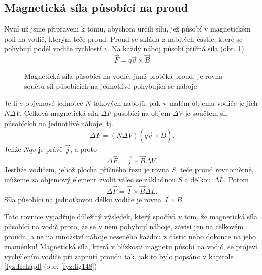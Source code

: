     \subsection{Magnetická síla působící na proud}
      \cite[s.~227]{Feynman02} Nyní už jsme připraveni k tomu, abychom určili sílu, jež působí v 
      magnetickém poli na vodič, kterým teče proud. Proud se skládá z nabitých částic, které se 
      pohybují podél vodiče rychlostí \(v\). Na každý náboj působí příčná síla (obr. 
      \ref{fyz:fig219}).
      \begin{equation}\label{fyz:eq_mag007}
        \vec{F} = q\vec{v}\times\vec{B}
      \end{equation}
      \begin{figure}[ht!]
        \centering
        \caption{Magnetická síla působící na vodič, jímž protéká proud, je rovna součtu sil 
                 působících na jednotlivé pohybující se náboje}
        \label{fyz:fig219} 
      \end{figure}
      Je-li v objemové jednotce \(N\) takových nábojů, pak v malém objemu vodiče je jich \(N\Delta 
      V\). Celková magnetická síla \(\Delta F\) působící na objem \(\Delta V\) je součtem sil 
      působících na jednotlivé náboje, tj.
      \begin{equation}\label{fyz:eq_mag008}
        \Delta\vec{F} = (N\Delta V)(q\vec{v}\times\vec{B}).
      \end{equation}
      Jenže \(Nqv\) je právě \(\vec{j}\), a proto
      \begin{equation}\label{fyz:eq_mag009}
      \Delta\vec{F} = \vec{j}\times\vec{B}\Delta V.
      \end{equation}
      Jestliže vodičem, jehož plocha příčného řezu je rovna \(S\), teče proud rovnoměrně, můžeme 
      za objemový element zvolit válec se základnou \(S\) a délkou \(\Delta L\). Potom
      \begin{equation}\label{fyz:eq_mag010}
      \Delta\vec{F} = \vec{I}\times\vec{B}\Delta L.
      \end{equation}
      Síla působící na jednotkovou délku vodiče je rovna \(\vec{I}\times\vec{B}\).
      
      Tato rovnice vyjadřuje důležitý výsledek, který spočívá v tom, že magnetická síla působící 
      na vodič proto, že se v něm pohybují náboje, závisí jen na celkovém proudu, a ne na množství 
      náboje neseného každou z částic nebo dokonce na jeho znaménku! Magnetická síla, která v 
      blízkosti magnetu působí na vodič, se projeví vychýlením vodiče při zapnutí proudu tak, jak 
      to bylo popsáno v kapitole \ref{fyz:IIchapI} (obr. \ref{fyz:fig148})

